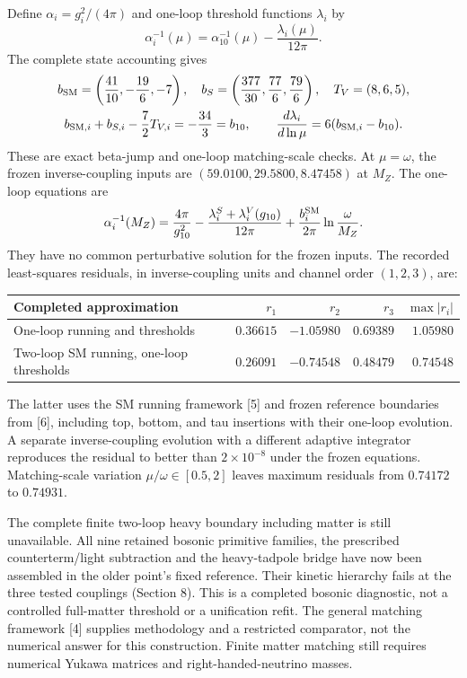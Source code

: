 \documentclass[10pt,letterpaper]{article}
\newcommand{\sect}[1]{\vspace{5pt}{\large\bfseries\color{ink}#1}\par}
\begin{document}
Define $\alpha_i=g_i^2/(4\pi)$ and one-loop threshold functions $\lambda_i$ by
\[
\alpha_i^{-1}(\mu)=\alpha_{10}^{-1}(\mu)-\frac{\lambda_i(\mu)}{12\pi}.
\]
The complete state accounting gives
\[
\begin{gathered}
b_{\rm SM}=\left(\frac{41}{10},-\frac{19}{6},-7\right),\quad
b_S=\left(\frac{377}{30},\frac{77}{6},\frac{79}{6}\right),\quad
T_V=(8,6,5),\\
b_{{\rm SM},i}+b_{S,i}-\frac72 T_{V,i}=-\frac{34}{3}=b_{10},\qquad
\frac{d\lambda_i}{d\ln\mu}=6(b_{{\rm SM},i}-b_{10}).
\end{gathered}
\]
These are exact beta-jump and one-loop matching-scale checks. At
$\mu=\omega$, the frozen inverse-coupling inputs are
$(59.0100,29.5800,8.47458)$ at $M_Z$. The one-loop equations are
\[
\alpha_i^{-1}(M_Z)=\frac{4\pi}{g_{10}^2}
-\frac{\lambda_i^S+\lambda_i^V(g_{10})}{12\pi}
+\frac{b_i^{\rm SM}}{2\pi}\ln\frac{\omega}{M_Z}.
\]
They have no common perturbative solution for the frozen inputs. The recorded
least-squares residuals, in inverse-coupling units and channel order $(1,2,3)$,
are:
\begin{center}
\begin{tabular}{lrrrr}
\toprule Completed approximation & $r_1$ & $r_2$ & $r_3$ & $\max|r_i|$\\
\midrule One-loop running and thresholds & $0.36615$ & $-1.05980$ & $0.69389$ & $1.05980$\\
Two-loop SM running, one-loop thresholds & $0.26091$ & $-0.74548$ & $0.48479$ & $0.74548$\\
\bottomrule
\end{tabular}
\end{center}
The latter uses the SM running framework [5] and frozen reference boundaries
from [6], including top, bottom, and tau insertions with their one-loop
evolution. A separate inverse-coupling evolution with a different adaptive
integrator reproduces the residual to better than $2\times10^{-8}$ under
the frozen equations. Matching-scale variation $\mu/\omega\in[0.5,2]$
leaves maximum residuals from $0.74172$ to $0.74931$.

\sect{What the missing calculation must supply}
The complete finite two-loop heavy boundary including matter is still
unavailable. All nine retained bosonic primitive families, the prescribed
counterterm/light subtraction and the heavy-tadpole bridge have now been
assembled in the older point's fixed reference. Their kinetic hierarchy
fails at the three tested couplings (Section 8). This is a completed
bosonic diagnostic, not a controlled full-matter threshold or a unification
refit. The general matching framework [4] supplies methodology and a
restricted comparator, not the numerical answer for this construction.
Finite matter matching still requires numerical Yukawa matrices and
right-handed-neutrino masses.
\end{document}

